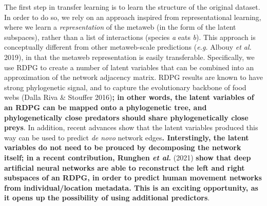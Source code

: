 \documentclass[11pt]{article}
\makeatletter
\def\maxwidth{\ifdim\Gin@nat@width>\linewidth\linewidth
\else\Gin@nat@width\fi}
\let\Oldincludegraphics\includegraphics
\renewcommand{\includegraphics}[1]{\Oldincludegraphics[width=\maxwidth]{#1}}
\providecommand{\DIFaddtex}[1]{{\bf #1}} %
\providecommand{\DIFdeltex}[1]{} %
\providecommand{\DIFaddbegin}{\protect\color{blue}} %
\providecommand{\DIFaddend}{\protect\color{black}} %
\providecommand{\DIFdelbegin}{\protect\color{red}} %
\providecommand{\DIFdelend}{\protect\color{black}} %
\providecommand{\DIFadd}[1]{\texorpdfstring{\DIFaddtex{#1}}{#1}} %
\providecommand{\DIFdel}[1]{\texorpdfstring{\DIFdeltex{#1}}{}} %
\newcommand{\DIFscaledelfig}{0.5}
\newlength{\DIFdelgraphicswidth} %
\newlength{\DIFdelgraphicsheight} %
\newcommand{\DIFaddincludegraphics}[2][]{{\color{blue}\fbox{\DIFOincludegraphics[#1]{#2}}}} %
\newcommand{\DIFdelincludegraphics}[2][]{%
\sbox{\DIFdelgraphicsbox}{\DIFOincludegraphics[#1]{#2}}%
\settoboxwidth{\DIFdelgraphicswidth}{\DIFdelgraphicsbox} %
\settoboxtotalheight{\DIFdelgraphicsheight}{\DIFdelgraphicsbox} %
\scalebox{\DIFscaledelfig}{%
\parbox[b]{\DIFdelgraphicswidth}{\usebox{\DIFdelgraphicsbox}\\[-\baselineskip] \rule{\DIFdelgraphicswidth}{0em}}\llap{\resizebox{\DIFdelgraphicswidth}{\DIFdelgraphicsheight}{%
\setlength{\unitlength}{\DIFdelgraphicswidth}%
\begin{picture}(1,1)%
\thicklines\linethickness{2pt} %
{\color[rgb]{1,0,0}\put(0,0){\framebox(1,1){}}}%
{\color[rgb]{1,0,0}\put(0,0){\line( 1,1){1}}}%
{\color[rgb]{1,0,0}\put(0,1){\line(1,-1){1}}}%
\end{picture}%
}\hspace*{3pt}}} %
} %
\DeclareRobustCommand{\DIFaddbegin}{\DIFOaddbegin \let\includegraphics\DIFaddincludegraphics} %
\DeclareRobustCommand{\DIFaddend}{\DIFOaddend \let\includegraphics\DIFOincludegraphics} %
\DeclareRobustCommand{\DIFdelbegin}{\DIFOdelbegin \let\includegraphics\DIFdelincludegraphics} %
\DeclareRobustCommand{\DIFdelend}{\DIFOaddend \let\includegraphics\DIFOincludegraphics} %
\makeatother
\begin{document}
The first step in transfer learning is to learn the structure of the
original dataset. In order to do so, we rely on an approach inspired
from representational learning, where we learn a \emph{representation}
of the metaweb (in the form of the latent subspaces), rather than a list
of interactions (species \emph{a} eats \emph{b}). This approach is
conceptually different from other metaweb-scale predictions (\emph{e.g.}
Albouy \emph{et al.} 2019), in that the metaweb representation is easily
transferable. Specifically, we use RDPG to create a number of latent
variables that can be combined into an approximation of the network
adjacency matrix. RDPG results are known to have strong phylogenetic
signal, and to capture the evolutionary backbone of food webs (Dalla
Riva \& Stouffer 2016)\DIFaddbegin \DIFadd{; in other words, the latent variables of an RDPG
can be mapped onto a phylogenetic tree, and phylogenetically close
predators should share phylogenetically close preys}\DIFaddend . In addition, recent
advances show that the latent variables produced this way can be used to
predict \emph{de novo} network edges\DIFaddbegin \DIFadd{. Interstingly, the latent variables
do not need to be prouced by decomposing the network itself; in a recent
contribution, Runghen \emph{et al.} }\DIFaddend (\DIFdelbegin \DIFdel{\emph{i.e.} interactions; Runghen \emph{et al.} }\DIFdelend 2021) \DIFaddbegin \DIFadd{show that deep artificial
neural networks are able to reconstruct the left and right subspaces of
an RDPG, in order to predict human movement networks from
individual/location metadata. This is an exciting opportunity, as it
opens up the possibility of using additional predictors}\DIFaddend .
\end{document}

